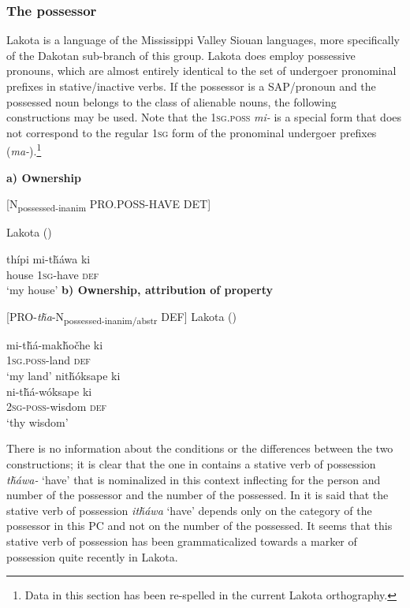 \documentclass[output=paper]{LSP/langsci}
\begin{document}
\subsubsection{The possessor}
Lakota is a language of the Mississippi Valley Siouan languages, more specifically of the Dakotan sub-branch of this group. Lakota does employ possessive pronouns, which are almost entirely identical to the set of undergoer pronominal prefixes in stative/inactive verbs. If the possessor is a SAP/pronoun and the possessed noun belongs to the class of alienable nouns, the following constructions may be used. Note that the \textsc{1sg.poss} \textit{mi-} is a special form that does not correspond to the regular \textsc{1sg} form of the pronominal undergoer prefixes (\textit{ma-}).\footnote{Data in this section has been re-spelled in the current Lakota orthography.}

\vspace{1em}
\textbf{a)	Ownership}

[N\textsubscript{possessed-inanim} PRO.POSS-HAVE DET]
\vspace{1em}

\ea Lakota (\citealt[98]{Buechel1939}) \label{lakotahouse}

\gll thípi     mi-t\v{h}áwa ki \\
house \textsc{1sg}-have  \textsc{def} \\
\glt `my house'
\z
\vspace{1em}
\textbf{b) Ownership, attribution of property}

[PRO-\textit{t\v{h}a}-N\textsubscript{possessed-inanim/abstr} DEF]
\vspace{1em}
\ea Lakota (\citealt[98]{Buechel1939}) \label{lakotalandwisdom}

\ea \gll mi-t\v{h}á-mak\v{h}o\v{c}he   ki \\
\textsc{1sg.poss}-land   \textsc{def} \\
\glt `my land'
\ex  
\glll nit\v{h}óksape ki \\
 ni-t\v{h}á-wóksape   ki \\
\textsc{2sg-poss}-wisdom  \textsc{def} \\
\glt `thy wisdom'
\z \z

There is no information about the conditions or the differences between the two constructions; it is clear that the one in  contains a stative verb of possession \textit{t\v{h}áwa-} `have' that is nominalized in this context inflecting for the person and number of the possessor and the number of the possessed. In \citet[458]{RoodTaylor1996} it is said that the stative verb of possession \textit{it\v{h}áwa} `have' depends only on the category of the possessor in this PC and not on the number of the possessed. It seems that this stative verb of possession has been grammaticalized towards a marker of possession quite recently in Lakota. 
\end{document}
